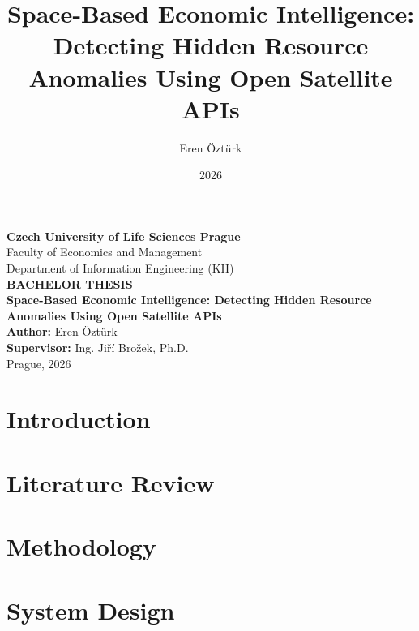 \documentclass[12pt,a4paper,oneside]{book}
\title{Space-Based Economic Intelligence: Detecting Hidden Resource Anomalies Using Open Satellite APIs}
\author{Eren \"{O}zt\"{u}rk}
\date{2026}  %
\begin{document}

\begin{titlepage}
\begin{center}
    \large
    \textbf{Czech University of Life Sciences Prague}\\
    Faculty of Economics and Management\\
    Department of Information Engineering (KII)\\
    \vspace{4cm}
    \Large
    \textbf{BACHELOR THESIS}\\
    \vspace{1.5cm}
    \huge
    \textbf{Space-Based Economic Intelligence: Detecting Hidden Resource Anomalies Using Open Satellite APIs}\\
    \vspace{4cm}
    \large
    \textbf{Author:} Eren \"{O}zt\"{u}rk\\
    \textbf{Supervisor:} Ing. Ji\v{r}\'{i} Bro\v{z}ek, Ph.D.\\
    \vspace{2cm}
    Prague, 2026 %
\end{center}
\end{titlepage}

\frontmatter



\tableofcontents
\listoffigures
\listoftables

\mainmatter

\chapter{Introduction}


\chapter{Literature Review}


\chapter{Methodology}


\chapter{System Design}

\end{document}
